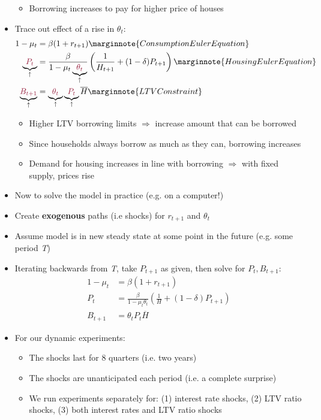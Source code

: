 \documentclass{article}
\numberwithin{equation}{section}
\numberwithin{figure}{section}
\begin{document}
\begin{itemize}
\begin{itemize}
			\item Borrowing increases to pay for higher price of houses
		\end{itemize}
		\item Trace out effect of a rise in \textcolor{myred}{\( \theta_t \)}:
		\begin{align*}
			1-\mu_t&=\beta(1+r_{t+1}) \marginnote{Consumption Euler Equation}\\
			\underbrace{\textcolor{myred}{P_t}}_\uparrow&=\frac{\beta}{1-\mu_t\underbrace{\textcolor{myred}{\theta_t}}_\uparrow}\left( \frac{1}{H_{t+1}} + (1-\delta)P_{t+1} \right) \marginnote{Housing Euler Equation}\\
			\underbrace{\textcolor{myred}{B_{t+1}}}_\uparrow&=\underbrace{\textcolor{myred}{\theta_t}}_\uparrow\underbrace{\textcolor{myred}{P_t}}_\uparrow\overline{H} \marginnote{LTV Constraint} 
		\end{align*}
		\begin{itemize}
			\item Higher LTV borrowing limits \( \Rightarrow \) increase amount that can be borrowed
			\item Since households always borrow as much as they can, borrowing increases
			\item Demand for housing increases in line with borrowing \( \Rightarrow \) with fixed supply, prices rise
		\end{itemize}
		\item Now to solve the model in practice (e.g. on a computer!)
		\item Create \textbf{exogenous} paths (i.e shocks) for \( r_{t+1} \) and \( \theta_t \)
		\item Assume model is in new steady state at some point in the future (e.g. some period \textit{T})
		\item Iterating backwards from \textit{T}, take \( P_{t+1} \) as given, then solve for \( P_t,B_{t+1} \):
		\begin{align*}
			1- \mu_t &= \beta(1+r_{t+1}) \\
			P_t &= \frac{\beta}{1-\mu_t\theta_t}\left( \frac{1}{H} + (1-\delta)P_{t+1} \right)\\
			B_{t+1} &= \theta_tP_t\overline{H}
		\end{align*}
		\item For our dynamic experiments:
		\begin{itemize}
			\item The shocks last for 8 quarters (i.e. two years)
			\item The shocks are unanticipated each period (i.e. a complete surprise)
			\item We run experiments separately for: (1) interest rate shocks, (2) LTV ratio shocks, (3) both interest rates and LTV ratio shocks
		\end{itemize}
	\end{itemize}
\end{document}
